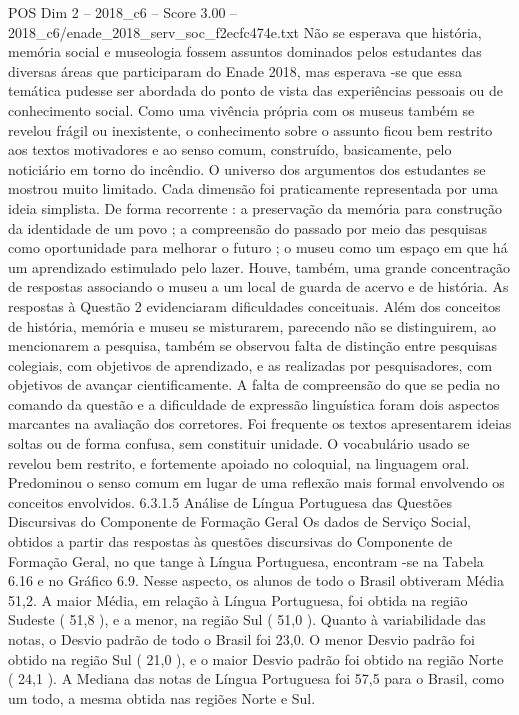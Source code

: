 \begin{textsample}{POS Dim 2 – 2018\_c6 – Score 3.00 – 2018\_c6/enade\_2018\_serv\_soc\_f2ecfc474e.txt}
Não se esperava que história, memória social e museologia fossem assuntos dominados pelos estudantes das diversas áreas que participaram do Enade 2018, mas esperava -se que essa temática pudesse ser abordada do ponto de vista das experiências pessoais ou de conhecimento social.
Como uma vivência própria com os museus também se revelou frágil ou inexistente, o conhecimento sobre o assunto ficou bem restrito aos textos motivadores e ao senso comum, construído, basicamente, pelo noticiário em torno do incêndio.
O universo dos argumentos dos estudantes se mostrou muito limitado.
Cada dimensão foi praticamente representada por uma ideia simplista.
De forma recorrente : a preservação da memória para construção da identidade de um povo ; a compreensão do passado por meio das pesquisas como oportunidade para melhorar o futuro ; o museu como um espaço em que há um aprendizado estimulado pelo lazer.
Houve, também, uma grande concentração de respostas associando o museu a um local de guarda de acervo e de história.
As respostas à Questão 2 evidenciaram dificuldades conceituais.
Além dos conceitos de história, memória e museu se misturarem, parecendo não se distinguirem, ao mencionarem a pesquisa, também se observou falta de distinção entre pesquisas colegiais, com objetivos de aprendizado, e as realizadas por pesquisadores, com objetivos de avançar cientificamente.
A falta de compreensão do que se pedia no comando da questão e a dificuldade de expressão linguística foram dois aspectos marcantes na avaliação dos corretores.
Foi frequente os textos apresentarem ideias soltas ou de forma confusa, sem constituir unidade.
O vocabulário usado se revelou bem restrito, e fortemente apoiado no coloquial, na linguagem oral.
Predominou o senso comum em lugar de uma reflexão mais formal envolvendo os conceitos envolvidos. 6.3.1.5 Análise de Língua Portuguesa das Questões Discursivas do Componente de Formação Geral Os dados de Serviço Social, obtidos a partir das respostas às questões discursivas do Componente de Formação Geral, no que tange à Língua Portuguesa, encontram -se na Tabela 6.16 e no Gráfico 6.9.
Nesse aspecto, os alunos de todo o Brasil obtiveram Média 51,2.
A maior Média, em relação à Língua Portuguesa, foi obtida na região Sudeste ( 51,8 ), e a menor, na região Sul ( 51,0 ).
Quanto à variabilidade das notas, o Desvio padrão de todo o Brasil foi 23,0.
O menor Desvio padrão foi obtido na região Sul ( 21,0 ), e o maior Desvio padrão foi obtido na região Norte ( 24,1 ).
A Mediana das notas de Língua Portuguesa foi 57,5 para o Brasil, como um todo, a mesma obtida nas regiões Norte e Sul.

\end{textsample}
